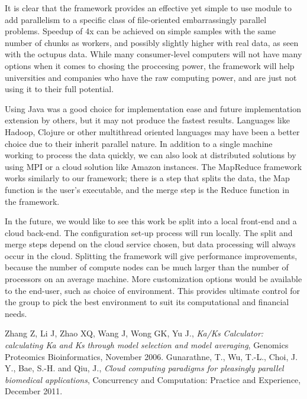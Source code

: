 \documentclass[12pt]{article}
\begin{document}
It is clear that the framework provides an effective yet simple to use module to
add parallelism to a specific class of file-oriented embarrassingly parallel
problems. Speedup of 4x can be achieved on simple samples with the same number
of chunks as workers, and possibly slightly higher with real data, as seen with
the octupus data. While many consumer-level computers will not have many options
when it comes to chosing the proccesing power, the framework will help
universities and companies who have the raw computing power, and are just not
using it to their full potential. 

Using Java was a good choice for implementation ease and future implementation
extension by others, but it may not produce the fastest results. Languages like
Hadoop, Clojure or other multithread oriented languages may have been a better
choice due to their inherit parallel nature. In addition to a single machine
working to process the data quickly, we can also look at distributed solutions
by using MPI or a cloud solution like Amazon instances. The MapReduce framework
works similarly to our framework; there is a step that splits the data, the Map
function is the user's executable, and the merge step is the Reduce function in
the framework. 

In the future, we would like to see this work be split into a local front-end
and a cloud back-end. The configuration set-up process will run locally. The
split and merge steps depend on the cloud service chosen, but data processing
will always occur in the cloud. Splitting the framework will give performance
improvements, because the number of compute nodes can be much larger than the
number of processors on an average machine. More customization options would be
available to the end-user, such as choice of environment. This provides ultimate
control for the group to pick the best environment to suit its computational and
financial needs.

\begin{thebibliography}{1}
Zhang Z, Li J, Zhao XQ, Wang J, Wong GK, Yu J., \emph{Ka/Ks Calculator: 
calculating Ka and Ks through model selection and model averaging},
Genomics Proteomics Bioinformatics, November 2006.
Gunarathne, T., Wu, T.-L., Choi, J. Y., Bae, S.-H. and Qiu, J., \emph{Cloud
computing paradigms for pleasingly parallel biomedical applications},
Concurrency and Computation: Practice and Experience, December 2011.
\end{thebibliography}
\end{document}
